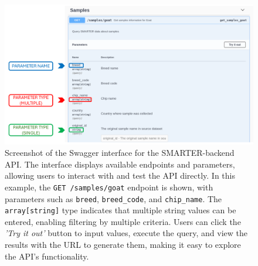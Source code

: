 \documentclass[a4paper,num-refs,gigabyte]{oup-contemporary}
\begin{document}
\begin{figure}
\centering
\includegraphics[width=.95\textwidth]{endpoints.png}
\caption{Screenshot of the Swagger interface for the SMARTER-backend API. The interface displays available endpoints and parameters, allowing users to interact with and test the API directly. In this example, the \texttt{GET /samples/goat} endpoint is shown, with parameters such as \texttt{breed}, \texttt{breed\_code}, and \texttt{chip\_name}. The \texttt{array[string]} type indicates that multiple string values can be entered, enabling filtering by multiple criteria. Users can click the \textit{'Try it out'} button to input values, execute the query, and view the results with the URL to generate them, making it easy to explore the API's functionality.}
\label{fig:endpoint}
\end{figure}
\end{document}
